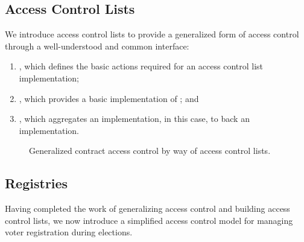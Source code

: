 





\subsection{Access Control Lists}

We introduce access control lists to provide a generalized form of access
control through a well-understood and common interface:

\begin{enumerate}
  \item {}, which defines the basic actions
    required for an access control list implementation;

  \item {}, which provides a basic implementation of
    ; and

  \item {}, which aggregates an
     implementation, 
    in this case, to back an  implementation.
\end{enumerate}

\begin{figure}[H]
  \centering
  \caption{Generalized contract access control by way of access control lists.}\label{fig:acl}
\end{figure}







\subsection{Registries}

Having completed the work of generalizing access control and building access
control lists, we now introduce a simplified access control model for managing
voter registration during elections.

